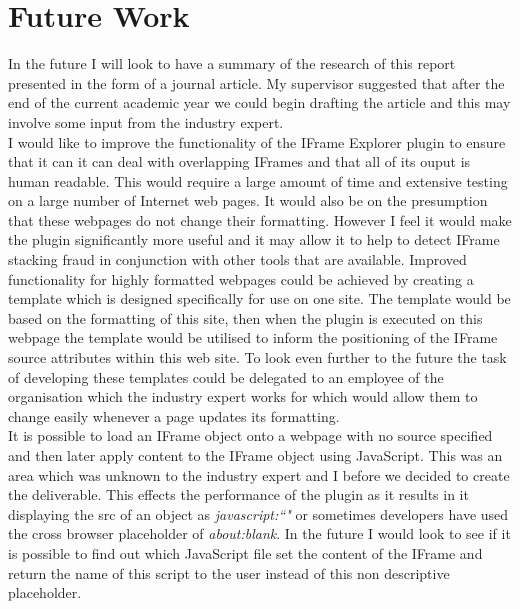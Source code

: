 \documentclass[12pt]{article}
\begin{document}
\section{Future Work} \label{futureWork}
In the future I will look to have a summary of the research of this report presented in the form of a journal article. My supervisor suggested that after the end of the current academic year we could begin drafting the article and this may involve some input from the industry expert. \\

I would like to improve the functionality of the IFrame Explorer plugin to ensure that it can it can deal with overlapping IFrames and that all of its ouput is human readable. This would require a large amount of time and extensive testing on a large number of Internet web pages. It would also be on the presumption that these webpages do not change their formatting. However I feel it would make the plugin significantly more useful and it may allow it to help to detect IFrame stacking fraud in conjunction with other tools that are available. Improved functionality for highly formatted webpages could be achieved by creating a template which is designed specifically for use on one site. The template would be based on the formatting of this site, then when the plugin is executed on this webpage the template would be utilised to inform the positioning of the IFrame source attributes within this web site. To look even further to the future the task of developing these templates could be delegated to an employee of the organisation which the industry expert works for which would allow them to change easily whenever a page updates its formatting. \\

It is possible to load an IFrame object onto a webpage with no source specified and then later apply content to the IFrame object using JavaScript. This was an area which was unknown to the industry expert and I before we decided to create the deliverable. This effects the performance of the plugin as it results in it displaying the src of an object as \textit{javascript:``"} or sometimes developers have used the cross browser placeholder of \textit{about:blank}. In the future I would look to see if it is possible to find out which JavaScript file set the content of the IFrame and return the name of this script to the user instead of this non descriptive placeholder.
\end{document}
